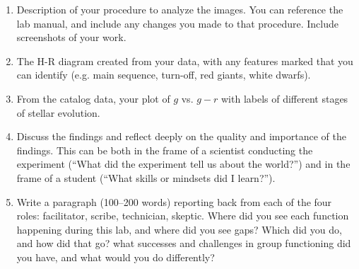 \begin{enumerate}

	
	\item Description of your procedure to analyze the images. You can reference the lab manual, and include any changes you made to that procedure. Include screenshots of your work.
	
	\item The H-R diagram created from your data, with any features marked that you can identify (e.g. main sequence, turn-off, red giants, white dwarfs).
	
	\item From the catalog data, your plot of $g$ vs. $g-r$ with labels of different stages of stellar evolution.
	
	
	
	
	\item Discuss the findings and reflect deeply on the quality and importance of the findings. This can be both in the frame of a scientist conducting the experiment (“What did the experiment tell us about the world?”) and in the frame of a student (“What skills or mindsets did I learn?”).
	
	\item Write a paragraph (100--200 words) reporting back from each of the four roles: facilitator, scribe, technician, skeptic. Where did you see each function happening during this lab, and where did you see gaps? Which did you do, and how did that go? what successes and	challenges in group functioning did you have, and what would you do differently?
\end{enumerate}
